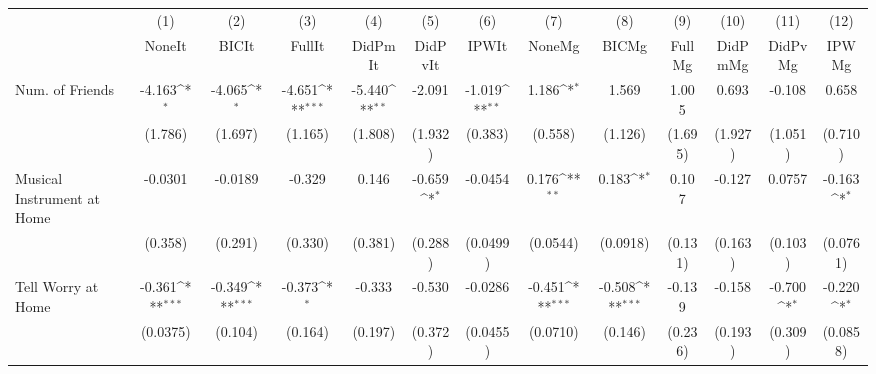 {
\def\sym#1{\ifmmode^{#1}\else\(^{#1}\)\fi}
\begin{tabular}{l*{12}{c}}
\toprule
            &\multicolumn{1}{c}{(1)}&\multicolumn{1}{c}{(2)}&\multicolumn{1}{c}{(3)}&\multicolumn{1}{c}{(4)}&\multicolumn{1}{c}{(5)}&\multicolumn{1}{c}{(6)}&\multicolumn{1}{c}{(7)}&\multicolumn{1}{c}{(8)}&\multicolumn{1}{c}{(9)}&\multicolumn{1}{c}{(10)}&\multicolumn{1}{c}{(11)}&\multicolumn{1}{c}{(12)}\\
            &\multicolumn{1}{c}{NoneIt}&\multicolumn{1}{c}{BICIt}&\multicolumn{1}{c}{FullIt}&\multicolumn{1}{c}{DidPmIt}&\multicolumn{1}{c}{DidPvIt}&\multicolumn{1}{c}{IPWIt}&\multicolumn{1}{c}{NoneMg}&\multicolumn{1}{c}{BICMg}&\multicolumn{1}{c}{FullMg}&\multicolumn{1}{c}{DidPmMg}&\multicolumn{1}{c}{DidPvMg}&\multicolumn{1}{c}{IPWMg}\\
\midrule
Num. of Friends&      -4.163\sym{*}  &      -4.065\sym{*}  &      -4.651\sym{***}&      -5.440\sym{**} &      -2.091         &      -1.019\sym{**} &       1.186\sym{*}  &       1.569         &       1.005         &       0.693         &      -0.108         &       0.658         \\
            &     (1.786)         &     (1.697)         &     (1.165)         &     (1.808)         &     (1.932)         &     (0.383)         &     (0.558)         &     (1.126)         &     (1.695)         &     (1.927)         &     (1.051)         &     (0.710)         \\
\addlinespace
Musical Instrument at Home&     -0.0301         &     -0.0189         &      -0.329         &       0.146         &      -0.659\sym{*}  &     -0.0454         &       0.176\sym{**} &       0.183\sym{*}  &       0.107         &      -0.127         &      0.0757         &      -0.163\sym{*}  \\
            &     (0.358)         &     (0.291)         &     (0.330)         &     (0.381)         &     (0.288)         &    (0.0499)         &    (0.0544)         &    (0.0918)         &     (0.131)         &     (0.163)         &     (0.103)         &    (0.0761)         \\
\addlinespace
Tell Worry at Home&      -0.361\sym{***}&      -0.349\sym{***}&      -0.373\sym{*}  &      -0.333         &      -0.530         &     -0.0286         &      -0.451\sym{***}&      -0.508\sym{***}&      -0.139         &      -0.158         &      -0.700\sym{*}  &      -0.220\sym{*}  \\
            &    (0.0375)         &     (0.104)         &     (0.164)         &     (0.197)         &     (0.372)         &    (0.0455)         &    (0.0710)         &     (0.146)         &     (0.236)         &     (0.193)         &     (0.309)         &    (0.0858)         \\

\end{tabular}}
